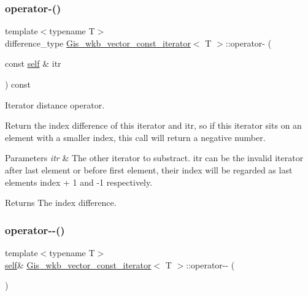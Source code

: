 \subsubsection{\texorpdfstring{operator-\/()}{operator-()}\hspace{0.1cm}{\footnotesize\ttfamily [2/2]}}
{\footnotesize\ttfamily template$<$typename T$>$ \\
difference\+\_\+type \mbox{\hyperlink{classGis__wkb__vector__const__iterator}{Gis\+\_\+wkb\+\_\+vector\+\_\+const\+\_\+iterator}}$<$ T $>$\+::operator-\/ (\begin{DoxyParamCaption}\item[{const \mbox{\hyperlink{classGis__wkb__vector__const__iterator}{self}} \&}]{itr }\end{DoxyParamCaption}) const\hspace{0.3cm}{\ttfamily [inline]}}



Iterator distance operator. 

Return the index difference of this iterator and itr, so if this iterator sits on an element with a smaller index, this call will return a negative number. 
\begin{DoxyParams}{Parameters}
{\em itr} & The other iterator to substract. itr can be the invalid iterator after last element or before first element, their index will be regarded as last element\textquotesingle{}s index + 1 and -\/1 respectively. \\
\hline
\end{DoxyParams}
\begin{DoxyReturn}{Returns}
The index difference. 
\end{DoxyReturn}
\mbox{\label{classGis__wkb__vector__const__iterator_a62e9c9573e8e44a8521f845da62f0cb2}} 
\subsubsection{\texorpdfstring{operator-\/-\/()}{operator--()}\hspace{0.1cm}{\footnotesize\ttfamily [1/2]}}
{\footnotesize\ttfamily template$<$typename T$>$ \\
\mbox{\hyperlink{classGis__wkb__vector__const__iterator}{self}}\& \mbox{\hyperlink{classGis__wkb__vector__const__iterator}{Gis\+\_\+wkb\+\_\+vector\+\_\+const\+\_\+iterator}}$<$ T $>$\+::operator-\/-\/ (\begin{DoxyParamCaption}{ }\end{DoxyParamCaption})\hspace{0.3cm}{\ttfamily [inline]}}




